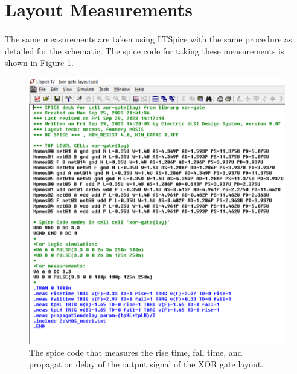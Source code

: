 \documentclass{article}
\begin{document}
\section{Layout Measurements}
  \paragraph{}
  The same measurements are taken using LTSpice with the same procedure as detailed for the schematic. The spice code for taking these measurements is shown in Figure \ref{fig:spice-meas-lay}.


  \begin{figure}[H]
    \centering
    \includegraphics[width=0.9\linewidth, frame]{screenshots/spice-meas-layout.png}
    \caption{The spice code that measures the rise time, fall time, and propagation delay of the output signal of the XOR gate layout.}
    \label{fig:spice-meas-lay}
  \end{figure}

\end{document}
